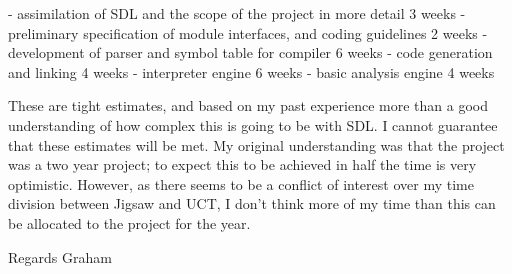   - assimilation of SDL and the scope of the project in more detail
	3 weeks
  - preliminary specification of module interfaces, and coding guidelines
	2 weeks
  - development of parser and symbol table for compiler
	6 weeks
  - code generation and linking
	4 weeks
  - interpreter engine
	6 weeks
  - basic analysis engine
	4 weeks

These are tight estimates, and based on my past experience
more than a good understanding of how complex this is going to be
with SDL. I cannot guarantee that these estimates will be met. My
original understanding was that the project was a two year project;
to expect this to be achieved in half the time is very optimistic.
However, as there seems to be a conflict of interest over my time
division between Jigsaw and UCT, I don't think more of my time than
this can be allocated to the project for the year.

Regards
Graham

